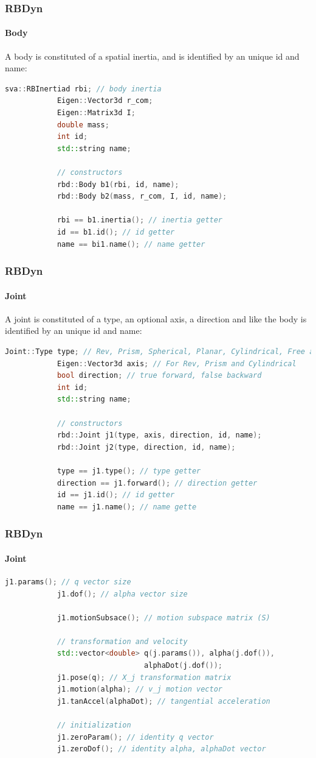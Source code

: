 \documentclass{beamer}
\begin{document}
  	\begin{frame}[fragile]
		\frametitle{RBDyn}
		\framesubtitle{Body}
		A body is constituted of a spatial inertia, and is identified by an unique id and name:
		\begin{lstlisting}[language=C++]
			sva::RBInertiad rbi; // body inertia
			Eigen::Vector3d r_com;
			Eigen::Matrix3d I;
			double mass;
			int id;
			std::string name;

			// constructors
			rbd::Body b1(rbi, id, name);
			rbd::Body b2(mass, r_com, I, id, name);

			rbi == b1.inertia(); // inertia getter
			id == b1.id(); // id getter
			name == bi1.name(); // name getter
		\end{lstlisting}
	\end{frame}

  	\begin{frame}[fragile]
		\frametitle{RBDyn}
		\framesubtitle{Joint}
		A joint is constituted of a type, an optional axis, a direction and like the body is identified by an
		unique id and name:
		\begin{lstlisting}[language=C++]
			Joint::Type type; // Rev, Prism, Spherical, Planar, Cylindrical, Free and Fixed
			Eigen::Vector3d axis; // For Rev, Prism and Cylindrical
			bool direction; // true forward, false backward
			int id;
			std::string name;

			// constructors
			rbd::Joint j1(type, axis, direction, id, name);
			rbd::Joint j2(type, direction, id, name);

			type == j1.type(); // type getter
			direction == j1.forward(); // direction getter
			id == j1.id(); // id getter
			name == j1.name(); // name gette
		\end{lstlisting}
	\end{frame}
  	\begin{frame}[fragile]
		\frametitle{RBDyn}
		\framesubtitle{Joint}
		\begin{lstlisting}[language=C++]
			j1.params(); // q vector size
			j1.dof(); // alpha vector size

			j1.motionSubsace(); // motion subspace matrix (S)

			// transformation and velocity
			std::vector<double> q(j.params()), alpha(j.dof()),
			                    alphaDot(j.dof());
			j1.pose(q); // X_j transformation matrix
			j1.motion(alpha); // v_j motion vector
			j1.tanAccel(alphaDot); // tangential acceleration

			// initialization
			j1.zeroParam(); // identity q vector
			j1.zeroDof(); // identity alpha, alphaDot vector
		\end{lstlisting}
	\end{frame}
\end{document}
